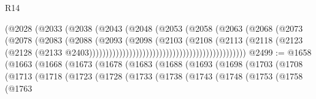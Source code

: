 \begin{lexlean}{R14}
\begin{coremodule}
                                                      (@2028
                                                        (@2033
                                                          (@2038
                                                            (@2043
                                                              (@2048
                                                                (@2053
                                                                  (@2058
                                                                    (@2063
                                                                      (@2068
                                                                        (@2073
                                                                          (@2078
                                                                            (@2083
                                                                              (@2088
                                                                                (@2093
                                                                                  (@2098
                                                                                    (@2103
                                                                                      (@2108
                                                                                        (@2113
                                                                                          (@2118
                                                                                            (@2123
                                                                                              (@2128
                                                                                                (@2133
                                                                                                  @2403)))))))))))))))))))))))))))))))))))))))))))))))
@2499 := @1658
    (@1663
      (@1668
        (@1673
          (@1678
            (@1683
              (@1688
                (@1693
                  (@1698
                    (@1703
                      (@1708
                        (@1713
                          (@1718
                            (@1723
                              (@1728
                                (@1733
                                  (@1738
                                    (@1743
                                      (@1748
                                        (@1753
                                          (@1758
                                            (@1763

\end{coremodule}
\end{lexlean}
